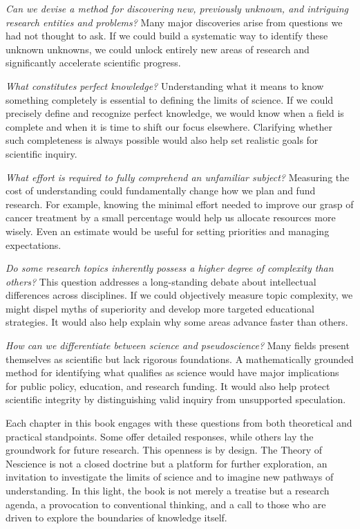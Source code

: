 \emph{Can we devise a method for discovering new, previously unknown, and intriguing research entities and problems?} Many major discoveries arise from questions we had not thought to ask. If we could build a systematic way to identify these unknown unknowns, we could unlock entirely new areas of research and significantly accelerate scientific progress.

\emph{What constitutes perfect knowledge?} Understanding what it means to know something completely is essential to defining the limits of science. If we could precisely define and recognize perfect knowledge, we would know when a field is complete and when it is time to shift our focus elsewhere. Clarifying whether such completeness is always possible would also help set realistic goals for scientific inquiry.

\emph{What effort is required to fully comprehend an unfamiliar subject?} Measuring the cost of understanding could fundamentally change how we plan and fund research. For example, knowing the minimal effort needed to improve our grasp of cancer treatment by a small percentage would help us allocate resources more wisely. Even an estimate would be useful for setting priorities and managing expectations.

\emph{Do some research topics inherently possess a higher degree of complexity than others?} This question addresses a long-standing debate about intellectual differences across disciplines. If we could objectively measure topic complexity, we might dispel myths of superiority and develop more targeted educational strategies. It would also help explain why some areas advance faster than others.

\emph{How can we differentiate between science and pseudoscience?} Many fields present themselves as scientific but lack rigorous foundations. A mathematically grounded method for identifying what qualifies as science would have major implications for public policy, education, and research funding. It would also help protect scientific integrity by distinguishing valid inquiry from unsupported speculation.

Each chapter in this book engages with these questions from both theoretical and practical standpoints. Some offer detailed responses, while others lay the groundwork for future research. This openness is by design. The Theory of Nescience is not a closed doctrine but a platform for further exploration, an invitation to investigate the limits of science and to imagine new pathways of understanding. In this light, the book is not merely a treatise but a research agenda, a provocation to conventional thinking, and a call to those who are driven to explore the boundaries of knowledge itself.

